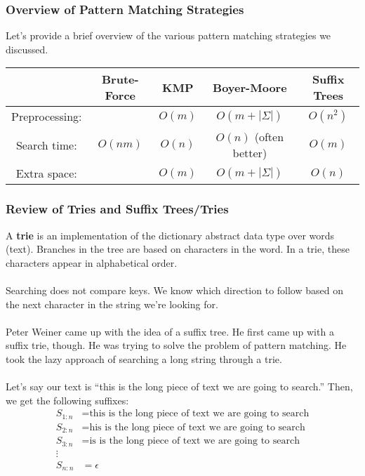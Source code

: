 \documentclass[]{article}
\theoremstyle{definition}
\newcommand{\lecture}[1]{\marginpar{{\footnotesize $\leftarrow$ \underline{#1}}}}
\begin{document}
			\subsubsection{Overview of Pattern Matching Strategies}
				Let's provide a brief overview of the various pattern matching strategies we discussed.

				\begin{center}
					\begin{tabular}{|c||c|c|c|c|}
						\hline
						& Brute-Force & KMP & Boyer-Moore & Suffix Trees \\ \hline
						Preprocessing: & & $O(m)$ & $O(m + |\Sigma|)$ & $O(n^2)$ \\
						Search time: & $O(nm)$ & $O(n)$ & $O(n)$ (often better) & $O(m)$ \\
						Extra space: & & $O(m)$ & $O(m + |\Sigma|)$ & $O(n)$ \\ \hline
					\end{tabular}
				\end{center}

			\subsubsection{Review of Tries and Suffix Trees/Tries} \lecture{March 26, 2013}
				A \textbf{trie} is an implementation of the dictionary abstract data type over words (text). Branches in the tree are based on characters in the word. In a trie, these characters appear in alphabetical order.
				\\ \\
				Searching does not compare keys. We know which direction to follow based on the next character in the string we're looking for.
				\\ \\
				Peter Weiner came up with the idea of a suffix tree. He first came up with a suffix trie, though. He was trying to solve the problem of pattern matching. He took the lazy approach of searching a long string through a trie.
				\\ \\
				Let's say our text is ``this is the long piece of text we are going to search.'' Then, we get the following suffixes:
				\begin{align*}
					S_{1:n} &= \text{this is the long piece of text we are going to search} \\
					S_{2:n} &= \text{his is the long piece of text we are going to search} \\
					S_{3:n} &= \text{is is the long piece of text we are going to search} \\
					\vdots& \\
					S_{n:n} &= \epsilon
				\end{align*}
\end{document}
